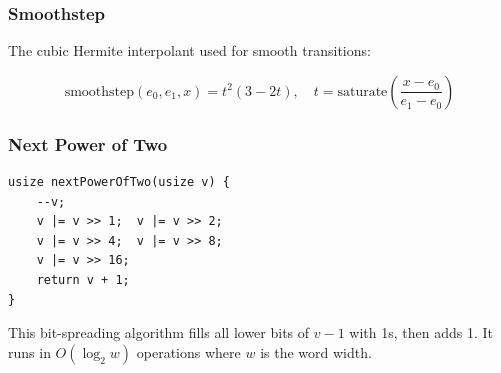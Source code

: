 \subsubsection{Smoothstep}

The cubic Hermite interpolant used for smooth transitions:

\begin{equation}
\text{smoothstep}(e_0, e_1, x)
= t^2(3 - 2t), \quad t = \text{saturate}\!\left(\frac{x - e_0}{e_1 - e_0}\right)
\end{equation}

\subsubsection{Next Power of Two}

\begin{lstlisting}[caption={Bit-manipulation power-of-two rounding}]
usize nextPowerOfTwo(usize v) {
    --v;
    v |= v >> 1;  v |= v >> 2;
    v |= v >> 4;  v |= v >> 8;
    v |= v >> 16;
    return v + 1;
}
\end{lstlisting}

This bit-spreading algorithm fills all lower bits of $v-1$ with 1s,
then adds 1. It runs in $O(\log_2 w)$ operations where $w$ is the word width.
